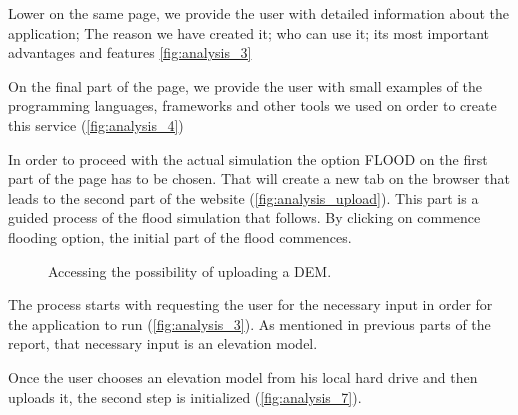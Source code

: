 Lower on the same page, we provide the user with detailed information about the application; The reason we have created it; who can use it; its most important advantages and features \autoref{fig:analysis_3}

On the final part of the page, we provide the user with small examples of the programming languages, frameworks and other tools we used on order to create this service (\autoref{fig:analysis_4})

In order to proceed with the actual simulation the option FLOOD on the first part of the page has to be chosen. That will create a new tab on the browser that leads to the second part of the website (\autoref{fig:analysis_upload}). This part is a guided process of the flood simulation that follows. By clicking on commence flooding option, the initial part of the flood commences.

\begin{figure}[h!]
  \myfloatalign
   \quad
   \quad
 \caption{Accessing the possibility of uploading a DEM.}
 \label{fig:analysis_upload}
\end{figure}

The process starts with requesting the user for the necessary input in order for the application to run (\autoref{fig:analysis_3}). As mentioned in previous parts of the report, that necessary input is an elevation model. 

Once the user chooses an elevation model from his local hard drive and then uploads it, the second step is initialized (\autoref{fig:analysis_7}). 



